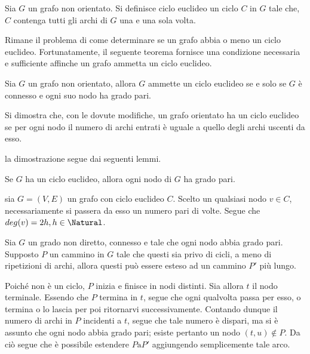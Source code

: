 \documentclass{subfiles}
\begin{document}
\begin{Definition*}
    Sia \(G\) un grafo non orientato. Si definisce ciclo euclideo un ciclo \(C\) in \(G\) tale che,
    \(C\) contenga tutti gli archi di \(G\) una e una sola volta.
\end{Definition*}

Rimane il problema di come determinare se un grafo abbia o meno un ciclo euclideo.
Fortunatamente, il seguente teorema fornisce una condizione necessaria e sufficiente affinche un grafo ammetta un ciclo euclideo.

\begin{Theorem}
    Sia \(G\) un grafo non orientato, allora \(G\) ammette un ciclo euclideo se e solo se \(G\) è connesso e ogni suo nodo ha grado pari.
    \begin{MarginNote}
        Si dimostra che, con le dovute modifiche,
        un grafo orientato ha un ciclo euclideo se per ogni nodo il numero di archi entrati è uguale a quello degli archi uscenti da esso.
    \end{MarginNote}

    \begin{Proof*}
        la dimostrazione segue dai seguenti lemmi.

        \begin{Lemma}
            Se \(G\) ha un ciclo euclideo, allora ogni nodo di \(G\) ha grado pari.

            \begin{Proof*}
                sia \(G = (V, E)\) un grafo con ciclo euclideo \(C\). Scelto un qualsiasi nodo \(v \in C\),
                necessariamente si passera da esso un numero pari di volte. Segue che \(deg(v) = 2h, h \in \Natural\).
            \end{Proof*}
        \end{Lemma}

        \begin{Lemma}
            Sia \(G\) un grado non diretto, connesso e tale che ogni nodo abbia grado pari.
            Supposto \(P\) un cammino in \(G\) tale che questi sia privo di cicli, a meno di ripetizioni di archi,
            allora questi può essere esteso ad un cammino \(P'\) più lungo.

            \begin{Proof*}
                Poiché non è un ciclo, \(P\) inizia e finisce in nodi distinti. Sia allora \(t\) il nodo terminale.
                Essendo che \(P\) termina in \(t\), segue che ogni qualvolta passa per esso, o termina o lo lascia per poi ritornarvi successivamente.
                Contando dunque il numero di archi in \(P\) incidenti a \(t\), segue che tale numero è dispari, ma si è assunto che ogni nodo abbia grado pari;
                esiste pertanto un nodo \((t, u) \notin P\). Da ciò segue che è possibile estendere \(P \text{a} P'\) aggiungendo semplicemente tale arco.
            \end{Proof*}
        \end{Lemma}


\end{Proof*}
\end{Theorem}
\end{document}
